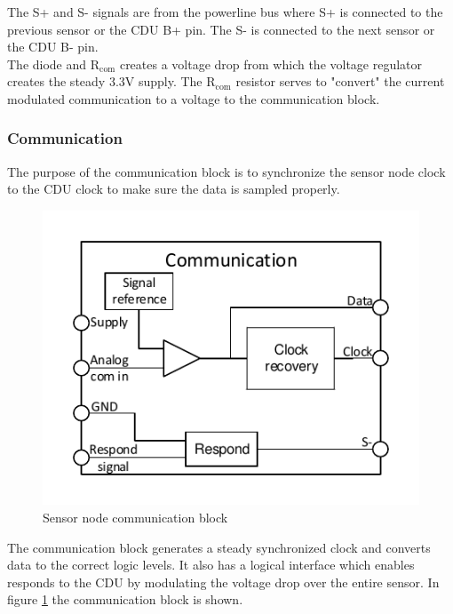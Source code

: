 The S+ and S- signals are from the powerline bus where S+ is connected to the previous sensor or the CDU B+ pin. The S- is connected to the next sensor or the CDU B- pin.\\

The diode and R$_{\text{com}}$ creates a voltage drop from which the voltage regulator creates the steady 3.3V supply. The R$_{\text{com}}$ resistor serves to "convert" the current modulated communication to a voltage to the communication block.

\subsubsection{Communication}

The purpose of the communication block is to synchronize the sensor node clock to the CDU clock to make sure the data is sampled properly.

\begin{figure}[H]
	\centering
	\includegraphics[width=.5\textwidth]{billeder/communication_sn}
	\caption{Sensor node communication block}
	\label{fig:SN_com_fig}
\end{figure}

The communication block generates a steady synchronized clock and converts data to the correct logic levels. It also has a logical interface which enables responds to the CDU by modulating the voltage drop over the entire sensor. In figure \ref{fig:SN_com_fig} the communication block is shown.

